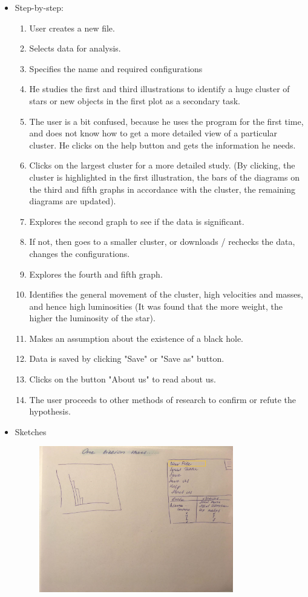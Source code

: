 \documentclass{article}
\begin{document}
\begin{itemize}
  

  \item  Step-by-step:
\begin{enumerate}
\item User creates a new file.
\item Selects data for analysis.
\item Specifies the name and required configurations
\item He studies the first and third illustrations to identify a huge cluster of stars or new objects in the first plot as a secondary task.
\item The user is a bit confused, because he uses the program for the first time, and does not know how to get a more detailed view of a particular cluster. He clicks on the help button and gets the information he needs.
\item Clicks on the largest cluster for a more detailed study. (By clicking, the cluster is highlighted in the first illustration, the bars of the diagrams on the third and fifth graphs in accordance with the cluster, the remaining diagrams are updated).
\item Explores the second graph to see if the data is significant.
\item If not, then goes to a smaller cluster, or downloads / rechecks the data, changes the configurations.
\item Explores the fourth and fifth graph.
\item Identifies the general movement of the cluster, high velocities and masses, and hence high luminosities (It was found that the more weight, the higher the luminosity of the star).
\item Makes an assumption about the existence of a black hole.
\item Data is saved by clicking "Save" or "Save as" button.
\item Clicks on the button "About us" to read about us.
\item The user proceeds to other methods of research to confirm or refute the hypothesis.
\end{enumerate}
\item Sketches


\begin{figure}[!h]
\centering
\includegraphics[width=0.8\textwidth]{images/Scenario1.jpg}
\label{fig14}
\end{figure}


\end{itemize}
\end{document}
